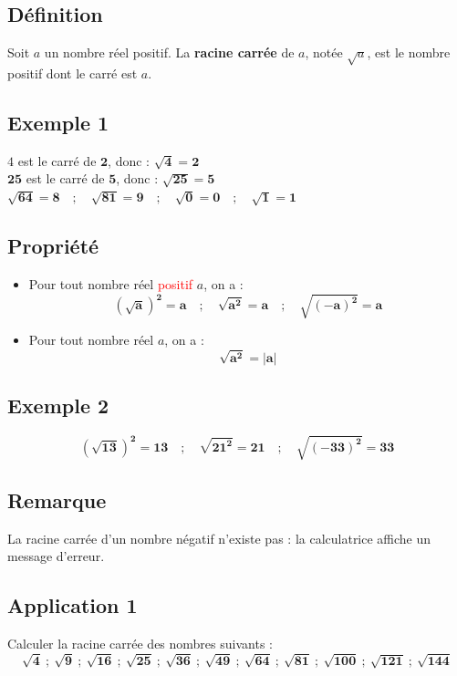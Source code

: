 \documentclass[12pt,a4paper]{article}
\begin{document}
\subsection*{\color{myred} Définition}
Soit $a$ un nombre réel positif. La \textbf{racine carrée} de $a$, notée $\sqrt{a}$, est le nombre positif dont le carré est $a$.
\subsection*{\color{myred} Exemple 1}
$4$ est le carré de $\mathbf{2}$, donc : $\mathbf{\sqrt{4} = 2}$ \\[0.2cm]
$\mathbf{25}$ est le carré de $\mathbf{5}$, donc : $\mathbf{\sqrt{25} = 5}$ \\[0.2cm]
$\mathbf{\sqrt{64} = 8 \quad ; \quad \sqrt{81} = 9 \quad ; \quad \sqrt{0} = 0 \quad ; \quad \sqrt{1} = 1}$
\subsection*{\color{myred} Propriété}
\begin{itemize}
\item Pour tout nombre réel \textcolor{red}{positif} $a$, on a :
\[
\mathbf{(\sqrt{a})^2 = a \quad ; \quad \sqrt{a^2} = a \quad ; \quad \sqrt{(-a)^2} = a}
\]
\item Pour tout nombre réel $a$, on a :
\[
\mathbf{\sqrt{a^2} = |a|}
\]
\end{itemize}
\subsection*{\color{myred} Exemple 2}
\[
\mathbf{(\sqrt{13})^2 = 13 \quad ; \quad \sqrt{21^2} = 21 \quad ; \quad \sqrt{(-33)^2} = 33}
\]
\subsection*{\color{myred} Remarque}
\noindent
La racine carrée d'un nombre négatif n'existe pas : la calculatrice affiche un message d'erreur.

\vspace{0.3cm}
\begin{center}
\end{center}
\subsection*{\color{myred} Application 1}
\noindent
Calculer la racine carrée des nombres suivants :
\[
\mathbf{\sqrt{4} \ ; \ \sqrt{9} \ ; \ \sqrt{16} \ ; \ \sqrt{25} \ ; \ \sqrt{36} \ ; \ \sqrt{49} \ ; \ \sqrt{64} \ ; \ \sqrt{81} \ ; \ \sqrt{100} \ ; \ \sqrt{121} \ ; \ \sqrt{144}}
\]
\end{document}
